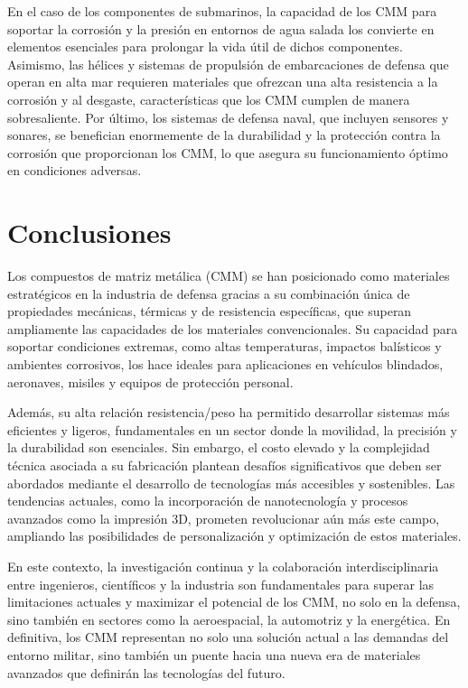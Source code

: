 \documentclass[letterpaper, 12pt]{article}
\begin{document}
En el caso de los componentes de submarinos, la capacidad de los CMM para
soportar la corrosión y la presión en entornos de agua salada los convierte en
elementos esenciales para prolongar la vida útil de dichos componentes.
Asimismo, las hélices y sistemas de propulsión de embarcaciones de defensa que
operan en alta mar requieren materiales que ofrezcan una alta resistencia a la
corrosión y al desgaste, características que los CMM cumplen de manera
sobresaliente. Por último, los sistemas de defensa naval, que incluyen sensores
y sonares, se benefician enormemente de la durabilidad y la protección contra
la corrosión que proporcionan los CMM, lo que asegura su funcionamiento óptimo
en condiciones adversas.

\section{Conclusiones}

Los compuestos de matriz metálica (CMM) se han posicionado como
materiales estratégicos en la industria de defensa gracias a su combinación
única de propiedades mecánicas, térmicas y de resistencia específicas, que
superan ampliamente las capacidades de los materiales convencionales. Su
capacidad para soportar condiciones extremas, como altas temperaturas, impactos
balísticos y ambientes corrosivos, los hace ideales para aplicaciones en
vehículos blindados, aeronaves, misiles y equipos de protección personal.

Además, su alta relación resistencia/peso ha permitido desarrollar sistemas más
eficientes y ligeros, fundamentales en un sector donde la movilidad, la
precisión y la durabilidad son esenciales. Sin embargo, el costo elevado y la
complejidad técnica asociada a su fabricación plantean desafíos significativos
que deben ser abordados mediante el desarrollo de tecnologías más accesibles y
sostenibles. Las tendencias actuales, como la incorporación de nanotecnología y
procesos avanzados como la impresión 3D, prometen revolucionar aún más este
campo, ampliando las posibilidades de personalización y optimización de estos
materiales.

En este contexto, la investigación continua y la colaboración
interdisciplinaria entre ingenieros, científicos y la industria son
fundamentales para superar las limitaciones actuales y maximizar el potencial
de los CMM, no solo en la defensa, sino también en sectores como la
aeroespacial, la automotriz y la energética. En definitiva, los CMM representan
no solo una solución actual a las demandas del entorno militar, sino también un
puente hacia una nueva era de materiales avanzados que definirán las
tecnologías del futuro.

\newpage

\printbibliography
\end{document}
